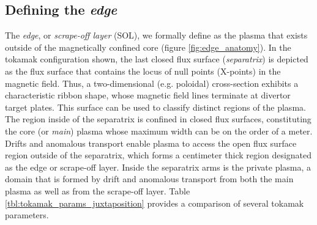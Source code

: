 \documentclass[11pt,titlepage]{report}
\begin{document}



\subsection{Defining the \emph{edge}}\label{sec:Defining_the_edge}

\indent \indent The \emph{edge}, or \emph{scrape-off layer} (SOL), we formally define as the plasma that exists outside of the magnetically confined core (figure \ref{fig:edge_anatomy}). In the tokamak configuration shown, the last closed flux surface (\emph{separatrix}) is depicted as the flux surface that contains the locus of null points (X-points) in the magnetic field. Thus, a two-dimensional (e.g. poloidal) cross-section exhibits a characteristic ribbon shape, whose magnetic field lines terminate at divertor target plates. This surface can be used to classify distinct regions of the plasma. The region inside of the separatrix is confined in closed flux surfaces, constituting the core (or \emph{main}) plasma whose maximum width can be on the order of a meter. Drifts and anomalous transport enable plasma to access the open flux surface region outside of the separatrix, which forms a centimeter thick region designated as the edge or scrape-off layer. Inside the separatrix arms is the private plasma, a domain that is formed by drift and anomalous transport from both the main plasma as well as from the scrape-off layer. Table \ref{tbl:tokamak_params_juxtaposition} provides a comparison of several tokamak parameters. 
\end{document}
